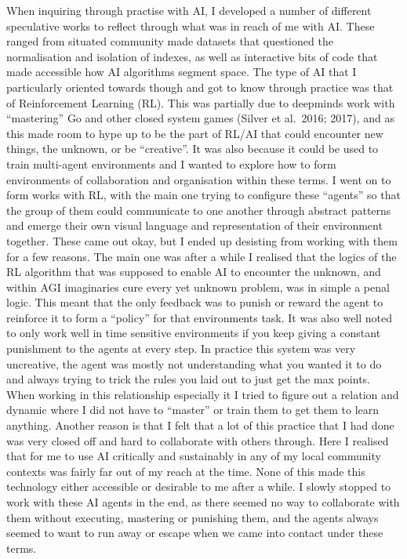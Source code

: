 When inquiring through practise with AI, I developed a number of
different speculative works to reflect through what was in reach of me
with AI. These ranged from situated community made datasets that
questioned the normalisation and isolation of indexes, as well as
interactive bits of code that made accessible how AI algorithms segment
space. The type of AI that I particularly oriented towards though and
got to know through practice was that of Reinforcement Learning (RL).
This was partially due to deepminds work with ``mastering'' Go and other
closed system games (Silver et al.~2016; 2017), and as this made room to
hype up to be the part of RL/AI that could encounter new things, the
unknown, or be ``creative''. It was also because it could be used to
train multi-agent environments and I wanted to explore how to form
environments of collaboration and organisation within these terms. I
went on to form works with RL, with the main one trying to configure
these ``agents'' so that the group of them could communicate to one
another through abstract patterns and emerge their own visual language
and representation of their environment together. These came out okay,
but I ended up desisting from working with them for a few reasons. The
main one was after a while I realised that the logics of the RL
algorithm that was supposed to enable AI to encounter the unknown, and
within AGI imaginaries cure every yet unknown problem, was in simple a
penal logic. This meant that the only feedback was to punish or reward
the agent to reinforce it to form a ``policy'' for that environments
task. It was also well noted to only work well in time sensitive
environments if you keep giving a constant punishment to the agents at
every step. In practice this system was very uncreative, the agent was
mostly not understanding what you wanted it to do and always trying to
trick the rules you laid out to just get the max points. When working in
this relationship especially it I tried to figure out a relation and
dynamic where I did not have to ``master'' or train them to get them to
learn anything. Another reason is that I felt that a lot of this
practice that I had done was very closed off and hard to collaborate
with others through. Here I realised that for me to use AI critically
and sustainably in any of my local community contexts was fairly far out
of my reach at the time. None of this made this technology either
accessible or desirable to me after a while. I slowly stopped to work
with these AI agents in the end, as there seemed no way to collaborate
with them without executing, mastering or punishing them, and the agents
always seemed to want to run away or escape when we came into contact
under these terms.


